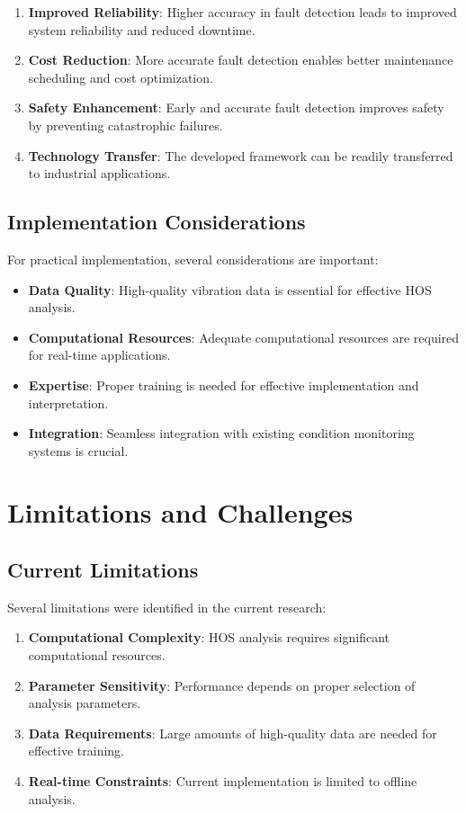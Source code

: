 \begin{enumerate}
    \item \textbf{Improved Reliability}: Higher accuracy in fault detection leads to improved system reliability and reduced downtime.
    \item \textbf{Cost Reduction}: More accurate fault detection enables better maintenance scheduling and cost optimization.
    \item \textbf{Safety Enhancement}: Early and accurate fault detection improves safety by preventing catastrophic failures.
    \item \textbf{Technology Transfer}: The developed framework can be readily transferred to industrial applications.
\end{enumerate}

\subsection{Implementation Considerations}

For practical implementation, several considerations are important:

\begin{itemize}
    \item \textbf{Data Quality}: High-quality vibration data is essential for effective HOS analysis.
    \item \textbf{Computational Resources}: Adequate computational resources are required for real-time applications.
    \item \textbf{Expertise}: Proper training is needed for effective implementation and interpretation.
    \item \textbf{Integration}: Seamless integration with existing condition monitoring systems is crucial.
\end{itemize}

\section{Limitations and Challenges}

\subsection{Current Limitations}

Several limitations were identified in the current research:

\begin{enumerate}
    \item \textbf{Computational Complexity}: HOS analysis requires significant computational resources.
    \item \textbf{Parameter Sensitivity}: Performance depends on proper selection of analysis parameters.
    \item \textbf{Data Requirements}: Large amounts of high-quality data are needed for effective training.
    \item \textbf{Real-time Constraints}: Current implementation is limited to offline analysis.
\end{enumerate}

